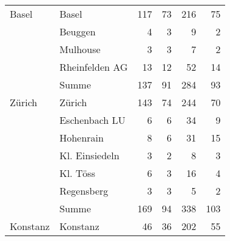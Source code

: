 \begin{xltabular}{\textwidth}{X l R R R R}
\midrule

Basel
	& Basel
	& 117
	& 73
	& 216
	& 75
	\\

	& Beuggen
	& 4
	& 3
	& 9
	& 2
	\\




	& Mulhouse
	& 3
	& 3
	& 7
	& 2
	\\

	& Rheinfelden AG
	& 13
	& 12
	& 52
	& 14
	\\


	& Summe
	& 137 %
	& 91 %
	& 284 %
	& 93 %
	\\

\midrule

Zürich
	& Zürich
	& 143
	& 74
	& 244
	& 70
	\\

	& Eschenbach LU
	& 6
	& 6
	& 34
	& 9
	\\

	& Hohenrain
	& 8
	& 6
	& 31
	& 15
	\\

	& Kl. Einsiedeln
	& 3
	& 2
	& 8
	& 3
	\\


	& Kl. Töss
	& 6
	& 3
	& 16
	& 4
	\\

	& Regensberg
	& 3
	& 3
	& 5
	& 2
	\\



	& Summe
	& 169 %
	& 94 %
	& 338 %
	& 103 %
	\\

\midrule

Konstanz
	& Konstanz
	& 46
	& 36
	& 202
	& 55
	\\



\end{xltabular}
